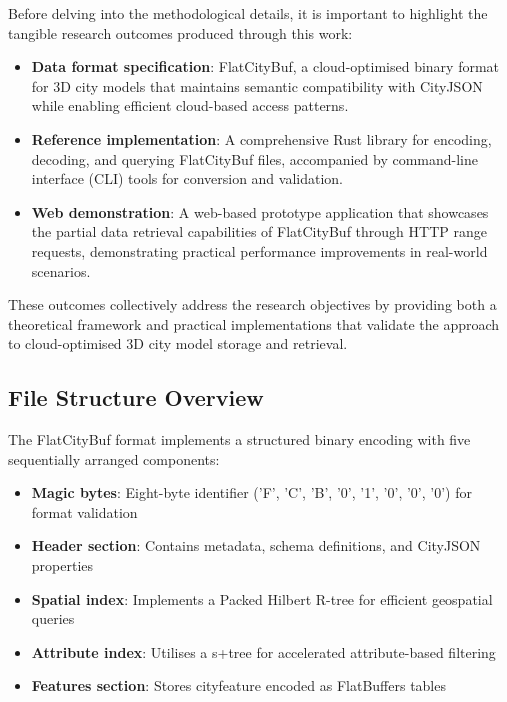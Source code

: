 Before delving into the methodological details, it is important to highlight the tangible research outcomes produced through this work:

\begin{itemize}
    \item \textbf{Data format specification}: FlatCityBuf, a cloud-optimised binary format for 3D city models that maintains semantic compatibility with CityJSON while enabling efficient cloud-based access patterns.

    \item \textbf{Reference implementation}: A comprehensive Rust library for encoding, decoding, and querying FlatCityBuf files, accompanied by command-line interface (CLI) tools for conversion and validation.

    \item \textbf{Web demonstration}: A web-based prototype application that showcases the partial data retrieval capabilities of FlatCityBuf through HTTP range requests, demonstrating practical performance improvements in real-world scenarios.
\end{itemize}

These outcomes collectively address the research objectives by providing both a theoretical framework and practical implementations that validate the approach to cloud-optimised 3D city model storage and retrieval.

\subsection{File Structure Overview}
\label{methodology:overview:file_structure}

The FlatCityBuf format implements a structured binary encoding with five sequentially arranged components:

\begin{itemize}
    \item \textbf{Magic bytes}: Eight-byte identifier ('F', 'C', 'B', '0', '1', '0', '0', '0') for format validation
    \item \textbf{Header section}: Contains metadata, schema definitions, and CityJSON properties
    \item \textbf{Spatial index}: Implements a Packed Hilbert R-tree for efficient geospatial queries
    \item \textbf{Attribute index}: Utilises a \ac{s+tree} for accelerated attribute-based filtering
    \item \textbf{Features section}: Stores \ac{cityfeature} encoded as FlatBuffers tables
\end{itemize}

